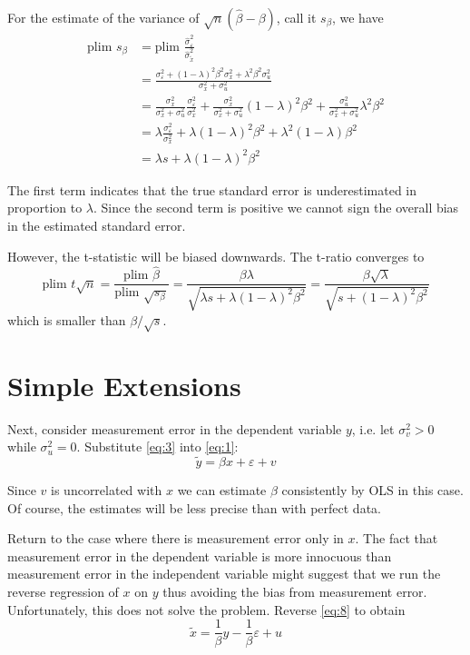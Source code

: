 \documentclass[12pt]{article}
\begin{document}
For the estimate of the variance of $\sqrt{n}(\hat{\beta} - \beta)$, call it $s_{\beta}$, we have
\begin{align*}
\text{plim } s_{\beta} &= \text{plim } \frac{\hat{\sigma}_{\varepsilon}^2}{\hat{\sigma}_{\tilde{x}}^2}\\
&= \frac{\sigma_{\varepsilon}^2 + (1 - \lambda)^2 \beta^2 \sigma_x^2 + \lambda^2 \beta^2 \sigma_u^2}{\sigma_x^2 + \sigma_u^2}\\
&= \frac{\sigma_x^2}{\sigma_x^2 + \sigma_u^2} \frac{\sigma_{\varepsilon}^2}{\sigma_x^2} + \frac{\sigma_x^2}{\sigma_x^2 + \sigma_u^2}(1 - \lambda)^2 \beta^2 + \frac{\sigma_u^2}{\sigma_x^2 + \sigma_u^2} \lambda^2 \beta^2\\
&= \lambda \frac{\sigma_{\varepsilon}^2}{\sigma_x^2} + \lambda(1 - \lambda)^2 \beta^2 + \lambda^2 (1 - \lambda) \beta^2\\
&= \lambda s + \lambda(1 - \lambda)^2 \beta^2
\end{align*}

The first term indicates that the true standard error is underestimated in proportion to $\lambda$. Since the second term is positive we cannot sign the overall bias in the estimated standard error.

However, the t-statistic will be biased downwards. The t-ratio converges to
\[
\text{plim } t\sqrt{n} = \frac{\text{plim } \hat{\beta}}{\text{plim } \sqrt{s_{\beta}}} = \frac{\beta \lambda}{\sqrt{\lambda s + \lambda(1 - \lambda)^2 \beta^2}} = \frac{\beta\sqrt{\lambda}}{\sqrt{s + (1 - \lambda)^2 \beta^2}}
\]
which is smaller than $\beta/\sqrt{s}$.

\section*{Simple Extensions}
Next, consider measurement error in the dependent variable $y$, i.e. let $\sigma_v^2 > 0$ while $\sigma_u^2 = 0$. Substitute \eqref{eq:3} into \eqref{eq:1}:
\[
\tilde{y} = \beta x + \varepsilon + v
\]


Since $v$ is uncorrelated with $x$ we can estimate $\beta$ consistently by OLS in this case. Of course, the estimates will be less precise than with perfect data.


Return to the case where there is measurement error only in $x$. The fact that measurement error in the dependent variable is more innocuous than measurement error in the independent variable might suggest that we run the reverse regression of $x$ on $y$ thus avoiding the bias from measurement error. Unfortunately, this does not solve the problem. Reverse \eqref{eq:8} to obtain
\[
\tilde{x} = \frac{1}{\beta}y - \frac{1}{\beta}\varepsilon + u
\]
\end{document}
